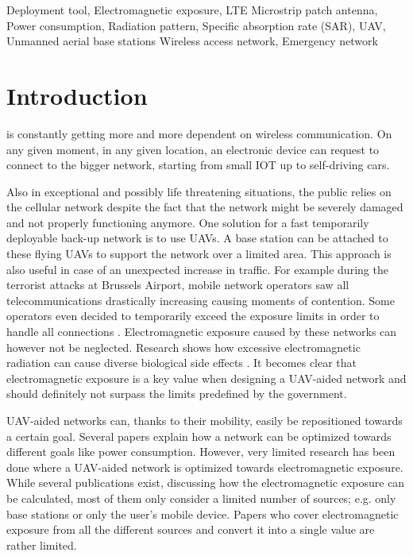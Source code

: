 \documentclass[twocolumn]{phdsymp} %
\begin{document}
\begin{keywords}
Deployment tool,  Electromagnetic exposure, LTE
Microstrip patch antenna, Power consumption,
Radiation pattern, Specific absorption rate (SAR),
UAV, Unmanned aerial base stations
Wireless access network, Emergency network
\end{keywords}

\section{Introduction}
 is constantly getting more and more dependent on wireless communication. 
On any given moment, in any given location, an electronic device
can request to connect to the bigger network, 
starting from small \gls{IOT} up to self-driving cars.

Also in exceptional and possibly life threatening situations, the public relies on the cellular network
despite the fact that the network might be severely damaged and not properly functioning anymore.
One solution for a fast temporarily deployable back-up network is to use \gls{UAV}s. A base station can be attached to 
these flying \gls{UAV}s to support the network over a limited area. 
This approach is also useful in case of an unexpected increase in traffic. 
For example during the terrorist attacks at Brussels Airport,
mobile network operators saw all telecommunications drastically increasing causing moments of contention. 
Some operators even decided to temporarily exceed the exposure limits in
order to handle all connections \cite{baseZaventem}.
Electromagnetic exposure caused by these networks can however not be neglected. 
Research shows how excessive electromagnetic radiation can cause diverse biological side effects \cite{J31_bioeffects,WHO}.
It becomes clear that electromagnetic exposure is a key value when designing a \gls{UAV}-aided network and should definitely 
not surpass the limits predefined by the government.

\gls{UAV}-aided networks can, thanks to their mobility, easily be repositioned towards a certain goal. Several papers 
explain how a network can be optimized towards different goals like power consumption.
However, very limited
research has been done where a \gls{UAV}-aided network is optimized towards electromagnetic exposure.
While several publications exist, discussing how the electromagnetic exposure can be calculated, 
most of them only consider a limited number of sources; e.g. only base stations or only the user's mobile device.
Papers who cover electromagnetic exposure from all the different sources and convert it into a single value are rather limited.
\end{document}
